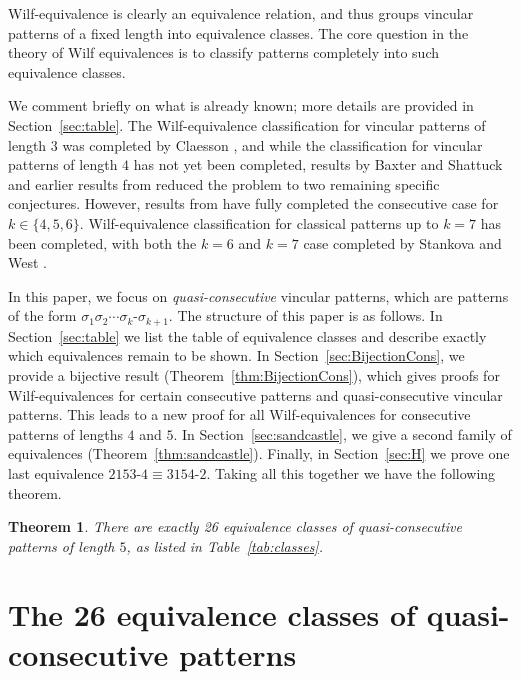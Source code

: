 \documentclass[11pt]{amsart}
\newtheorem{theorem}{Theorem}[section]
\theoremstyle{definition}
\begin{document}
Wilf-equivalence is clearly an equivalence relation, and thus groups vincular patterns of a fixed length into equivalence classes.
The core question in the theory of Wilf equivalences is to
classify patterns completely into such equivalence classes.

We comment briefly on what is already known;
more details are provided in Section~\ref{sec:table}.
The Wilf-equivalence classification for vincular patterns of length $3$
was completed by Claesson \cite{Claesson2001}, and while
the classification for vincular patterns of length $4$ has not yet been completed,
results by Baxter and Shattuck \cite{BaxterShattuckMainPaper}
and earlier results from
\cite{Baxter2013,Elizalde2006,ElizaldeNoy2003,Kasraoui2013,Kitaev2005}
reduced the problem to two remaining specific conjectures.
However, results from \cite{ElizaldeNoy2003,Nakamura2011,ElizaldeNoy2012}
have fully completed the consecutive case for $k \in \{4,5,6\}$.
Wilf-equivalence classification for classical patterns
up to $k = 7$ has been completed,
with both the $k = 6$ and $k = 7$ case completed by Stankova and West
\cite{StankovaWest2002}.

In this paper, we focus on \emph{quasi-consecutive} vincular patterns,
which are patterns of the form $\sigma_1\sigma_2\cdots\sigma_{k} {\text{-}} \sigma_{k+1}$. 
The structure of this paper is as follows.
	In Section~\ref{sec:table}
	we list the table of equivalence classes and describe
	exactly which equivalences remain to be shown.
	In Section~\ref{sec:BijectionCons},
	we provide a bijective result (Theorem~\ref{thm:BijectionCons}),
	which gives proofs for Wilf-equivalences for certain
    consecutive patterns and quasi-consecutive vincular patterns.  
    This leads to a new proof for all Wilf-equivalences 
    for consecutive patterns of lengths $4$ and $5$.
	In Section~\ref{sec:sandcastle},
	we give a second family of equivalences (Theorem~\ref{thm:sandcastle}).
	Finally, in Section~\ref{sec:H} we prove one last equivalence $2153{\text{-}}4 \equiv 3154{\text{-}}2$.
Taking all this together we have the following theorem.
\begin{theorem}
	There are exactly 26 equivalence classes of
	quasi-consecutive patterns of length $5$,
	as listed in Table~\ref{tab:classes}.
\end{theorem}

\section{The 26 equivalence classes of quasi-consecutive patterns}
\end{document}

